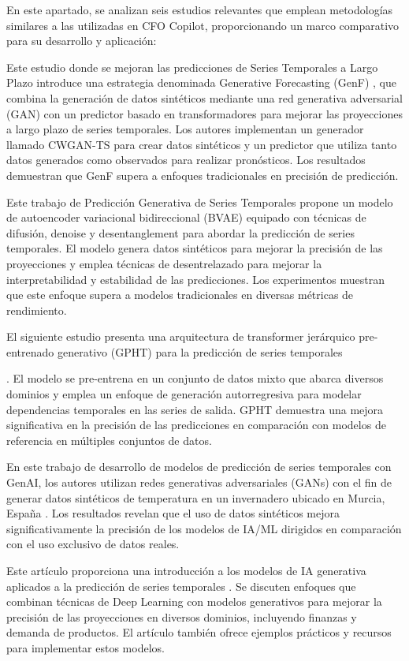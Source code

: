 \documentclass[12pt,letterpaper,oneside]{report}
\renewcommand{\_}{\UnderscoreOriginal\allowbreak}
\begin{document}
En este apartado, se analizan seis estudios relevantes que emplean metodologías similares a las utilizadas en CFO Copilot, proporcionando un marco comparativo para su desarrollo y aplicación:

Este estudio donde se mejoran las predicciones de Series Temporales a Largo Plazo introduce una estrategia denominada Generative Forecasting (GenF) \parencite{Liu2022}, que combina la generación de datos sintéticos mediante una red generativa adversarial (GAN) con un predictor basado en transformadores para mejorar las proyecciones a largo plazo de series temporales. Los autores implementan un generador llamado CWGAN-TS para crear datos sintéticos y un predictor que utiliza tanto datos generados como observados para realizar pronósticos. Los resultados demuestran que GenF supera a enfoques tradicionales en precisión de predicción.

Este trabajo de Predicción Generativa de Series Temporales \parencite{Li2023} propone un modelo de autoencoder variacional bidireccional (BVAE) equipado con técnicas de difusión, denoise y desentanglement para abordar la predicción de series temporales. El modelo genera datos sintéticos para mejorar la precisión de las proyecciones y emplea técnicas de desentrelazado para mejorar la interpretabilidad y estabilidad de las predicciones. Los experimentos muestran que este enfoque supera a modelos tradicionales en diversas métricas de rendimiento.

El siguiente estudio presenta una arquitectura de transformer jerárquico pre-entrenado generativo (GPHT) para la predicción de series temporales \parencite{Liu2024a}

. El modelo se pre-entrena en un conjunto de datos mixto que abarca diversos dominios y emplea un enfoque de generación autorregresiva para modelar dependencias temporales en las series de salida. GPHT demuestra una mejora significativa en la precisión de las predicciones en comparación con modelos de referencia en múltiples conjuntos de datos.

En este trabajo de desarrollo de modelos de predicción de series temporales con GenAI, los autores utilizan redes generativas adversariales (GANs) con el fin de generar datos sintéticos de temperatura en un invernadero ubicado en Murcia, España \parencite{MoralesGarcia2023}. Los resultados revelan que el uso de datos sintéticos mejora significativamente la precisión de los modelos de IA/ML dirigidos en comparación con el uso exclusivo de datos reales.

Este artículo proporciona una introducción a los modelos de IA generativa aplicados a la predicción de series temporales \parencite{Yoshimatsu2024}. Se discuten enfoques que combinan técnicas de Deep Learning con modelos generativos para mejorar la precisión de las proyecciones en diversos dominios, incluyendo finanzas y demanda de productos. El artículo también ofrece ejemplos prácticos y recursos para implementar estos modelos.
\end{document}
